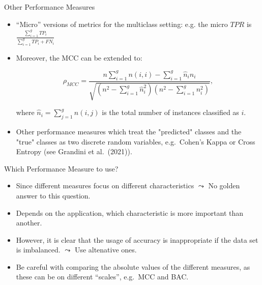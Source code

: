 \documentclass[11pt,compress,t,notes=noshow, xcolor=table]{beamer}
\begin{document}
\begin{vbframe}{Other Performance Measures}

	\footnotesize{

		\begin{itemize}
		
			\item ``Micro'' versions of metrics for the multiclass setting: e.g. the micro $TPR$ is $\frac{\sum_{i=1}^g TP_i}{\sum_{i=1}^g TP_i + FN_i}$ 
            \vspace{10pt}
		
			\item Moreover, the MCC can be extended to:
			
			$$   \rho_{MCC} = \frac{ n  \sum_{i=1}^g n(i,i) -  \sum_{i=1}^g \hat n_i n_i}{\sqrt{ (n^2 - \sum_{i=1}^g \hat n_i^2)(n^2 - \sum_{i=1}^g n_i^2)  }},$$

			where $\hat n_i = \sum_{j=1}^g n(i,j)$ is the total number of instances classified as $i.$
            \vspace{10pt}
        
		
			\item Other performance measures which treat the "predicted" classes and the "true" classes as two discrete random variables, e.g.\ Cohen's Kappa or Cross Entropy (see Grandini et al.\ (2021)).
		
		\end{itemize}
	}
\end{vbframe}


\begin{vbframe}{Which Performance Measure to use?}

	\small{

		\begin{itemize}

            \item Since different measures focus on different characteristics $\leadsto$ No golden answer to this question.
            \vspace{20pt}
	
			\item Depends on the application, which characteristic is more important than another.
            \vspace{20pt}

			\item However, it is clear that the usage of accuracy is inappropriate if the data set is imbalanced. $\leadsto$ Use altenative ones.
            \vspace{20pt}

			\item Be careful with comparing the absolute values of the different measures, as these can be on different ``scales'', e.g.\ MCC and BAC. 
            \vspace{20pt}
	
		\end{itemize}
	}
\end{vbframe}



%
\endlecture
\end{document}
